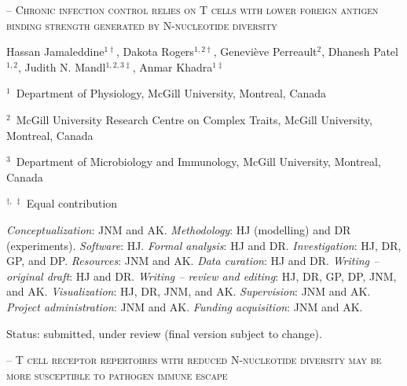 \vspace{24pt}


\textsc{} -- \textsc{Chronic infection control relies on T cells with lower foreign antigen binding strength generated by N-nucleotide diversity}

\hspace*{0.25in}%
\begin{minipage}{6in}
    \setlength{\parskip}{1pt}
    \vspace{6pt}
    Hassan Jamaleddine$^{1 \dagger}$, Dakota Rogers$^{1,2 \dagger }$, Geneviève Perreault$^{2}$, Dhanesh Patel$^{1,2}$, Judith N. Mandl$^{1,2,3 \ddagger }$, Anmar Khadra$^{1 \ddagger }$

    \vspace{6pt}
    
    {\small $^1$~Department of Physiology, McGill University, Montreal, Canada \par $^2$~McGill University Research Centre on Complex Traits, McGill University, Montreal, Canada \par $^3$~Department of Microbiology and Immunology, McGill University, Montreal, Canada \par $^{\dagger,\,\ddagger}$ Equal contribution}
\end{minipage}

\hspace*{0.25in}%
\begin{minipage}{6in}
    \textit{Conceptualization}: JNM and AK. \textit{Methodology}: HJ (modelling) and DR (experiments). \textit{Software}: HJ. \textit{Formal analysis}: HJ and DR. \textit{Investigation}: HJ, DR, GP, and DP. \textit{Resources}: JNM and AK. \textit{Data curation}: HJ and DR. \textit{Writing -- original draft}: HJ and DR. \textit{Writing – review and editing}: HJ, DR, GP, DP, JNM, and AK. \textit{Visualization}: HJ, DR, JNM, and AK. \textit{Supervision}: JNM and AK. \textit{Project administration}: JNM and AK. \textit{Funding acquisition}: JNM and AK.
    
    \vspace{6pt}

    Status: submitted, under review (final version subject to change).
\end{minipage}

\vspace{24pt}


\textsc{} -- \textsc{T cell receptor repertoires with reduced N-nucleotide diversity may be more susceptible to pathogen immune escape}

